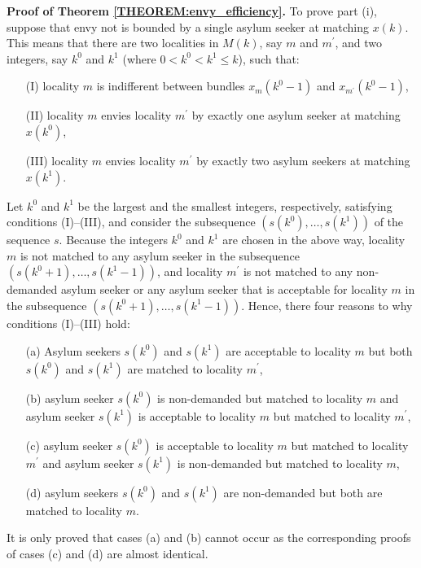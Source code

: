 \documentclass[12pt,fleqn]{article}
\begin{document}
\noindent\textbf{Proof of Theorem \ref{THEOREM:envy_efficiency}.} To prove part (i), suppose that envy not is bounded by a single asylum seeker at matching $x(k)$. This means that there are two localities in $M(k)$, say $m$ and $m^\prime$, and two integers, say $k^0$ and $k^1$ (where $0<k^0<k^1\leq k$), such that:
\begin{itemize}
\item[(I)] locality $m$ is indifferent between bundles $x_{m}(k^0-1)$ and $x_{m^\prime}(k^0-1)$,
\item[(II)] locality $m$ envies locality $m^\prime$ by exactly one asylum seeker at matching $x(k^0)$,
\item[(III)] locality $m$ envies locality $m^\prime$ by exactly two asylum seekers at matching $x(k^1)$.
\end{itemize}
\noindent Let $k^0$ and $k^1$ be the largest and the smallest integers, respectively, satisfying conditions (I)--(III), and consider the subsequence $(s(k^0),\ldots,s(k^1))$ of the sequence $s$. Because the integers $k^0$ and $k^1$ are chosen in the above way, locality $m$ is not matched to any asylum seeker in the subsequence $(s(k^0+1),\ldots,s(k^1-1))$, and
locality $m^\prime$ is not matched to any non-demanded asylum seeker or any asylum seeker that is acceptable for locality $m$ in the subsequence $(s(k^0+1),\ldots,s(k^1-1))$. Hence, there four reasons to why conditions (I)--(III) hold:
\begin{itemize}
\item[(a)] Asylum seekers $s(k^0)$ and $s(k^1)$ are acceptable to locality $m$ but both $s(k^0)$ and $s(k^1)$ are matched to locality $m^\prime$,
\item[(b)] asylum seeker $s(k^0)$ is non-demanded but matched to locality $m$ and asylum seeker $s(k^1)$ is acceptable to locality $m$ but matched to locality $m^\prime$,
\item[(c)] asylum seeker $s(k^0)$ is acceptable to locality $m$ but matched to locality $m^\prime$ and asylum seeker $s(k^1)$ is non-demanded but matched to locality $m$,
\item[(d)] asylum seekers $s(k^0)$ and $s(k^1)$ are non-demanded but both are matched to locality $m$.
\end{itemize}
\noindent It is only proved that cases (a) and (b) cannot occur as the corresponding proofs of cases (c) and (d) are almost identical.
\end{document}
